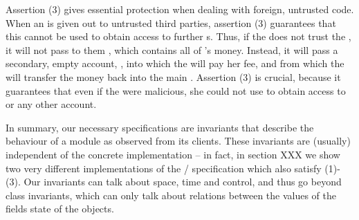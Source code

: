 Assertion (3) gives essential protection when dealing with foreign, untrusted code.
When an  is given out to untrusted third parties, assertion (3) guarantees that
this  cannot be used to obtain access to further  s. 
Thus, if the  does not trust the , it will not pass to them , which
contains all of 's money. Instead, it will pass a secondary, empty account, ,
into which the   will pay her fee, and from which the  will transfer the money
back into the main . Assertion (3) is crucial, because it guarantees that even 
if the  were malicious, she could not use   to obtain access to
  or any other account. %


 
\vspace{.1cm} 

In summary, our  necessary specifications are invariants that describe the
behaviour of a module as observed from its clients. 
These invariants are (usually) independent of the concrete implementation --
in fact, in section XXX we show two very different implementations
of the / specification which also satisfy (1)-(3).
Our invariants 
 can talk about space, time and control, and thus go beyond
 class invariants, which can only
talk   about relations between the  values of the fields state of the objects.
